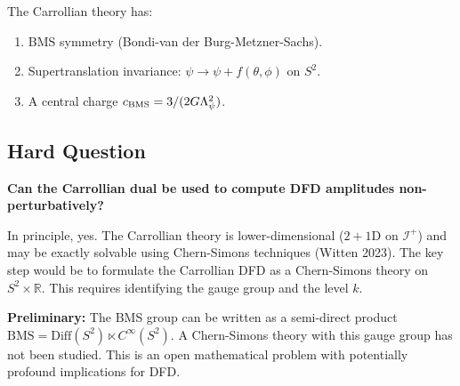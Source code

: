 \documentclass[11pt,a4paper]{article}
\begin{document}
The Carrollian theory has:
\begin{enumerate}
\item BMS symmetry (Bondi-van der Burg-Metzner-Sachs).
\item Supertranslation invariance: $\psi \to \psi + f(\theta,\phi)$ on $S^2$.
\item A central charge $c_{\rm BMS} = 3/(2G\Lambda_\psi^2)$.
\end{enumerate}

\subsection{Hard Question}

\textbf{Can the Carrollian dual be used to compute DFD amplitudes non-perturbatively?}

In principle, yes. The Carrollian theory is lower-dimensional ($2+1$D on $\mathscr{I}^+$) and may be exactly solvable using Chern-Simons techniques (Witten 2023). The key step would be to formulate the Carrollian DFD as a Chern-Simons theory on $S^2 \times \mathbb{R}$. This requires identifying the gauge group and the level $k$.

\textbf{Preliminary:} The BMS group can be written as a semi-direct product $\text{BMS} = \text{Diff}(S^2) \ltimes C^\infty(S^2)$. A Chern-Simons theory with this gauge group has not been studied. This is an open mathematical problem with potentially profound implications for DFD.
\end{document}
